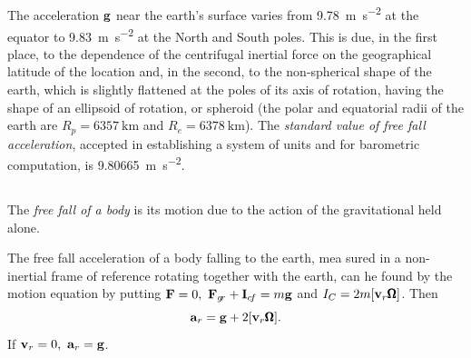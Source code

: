 \subsection{}\label{7.3.4} The acceleration $\vb{g}$ near the earth's surface varies from \SI{9.78}{\meter\per\second\squared} at the equator to \SI{9.83}{\meter\per\second\squared} at the North and South poles. This is due, in the first place, to the dependence of the centrifugal inertial force on the geographical latitude of the location and, in the second, to the non-spherical shape of the earth, which is slightly flattened at the poles of its axis of rotation, having the shape of an ellipsoid of rotation, or sphe­roid (the polar and equatorial radii of the earth are $R_{p} = \SI{6357}{\kilo\meter}$ and $R_{e} = \SI{6378}{\kilo\meter}$). The \emph{standard value of free fall acceleration}, accepted in establishing a system of units and for barometric computation, is \SI{9.80665}{\meter\per\second\squared}.

\subsection{}\label{7.3.5} The \emph{free fall of a body} is its motion due to the action of the gravitational held alone.

The free fall acceleration of a body falling to the earth, mea­ sured in a non-inertial frame of reference rotating together with the earth, can he found by the motion equation  by putting $\vb{F} = 0, \,\, \vb{F}_{g\!r} + \vb{I}_{c\!f} = m\vb{g}$ and $I_{C} = 2m \qty[\vb{v}_{r}\pmb{\Omega}]$. Then
\begin{equation*}%
\vb{a}_{r}= \vb{g} + 2\qty[\vb{v}_{r}\pmb{\Omega}].
\end{equation*}
If $\vb{v}_{r} = 0, \,\, \vb{a}_{r} = \vb{g}$.


